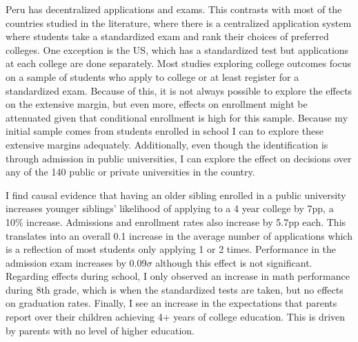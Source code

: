 Peru has decentralized applications and exams. This contrasts with most of the countries studied in the literature, where there is a centralized application system where students take a standardized exam and rank their choices of preferred colleges. One exception is the US, which has a standardized test but applications at each college are done separately.  Most studies exploring college outcomes focus on a sample of students who apply to college or at least register for a standardized exam. Because of this, it is not always possible to explore the effects on the extensive margin, but even more, effects on enrollment might be attenuated given that conditional enrollment is high for this sample. Because my initial sample comes from students enrolled in school I can to explore these extensive margins adequately. Additionally, even though the identification is through admission in public universities, I can explore the effect on decisions over any of the 140 public or private universities in the country.







I find causal evidence that having an older sibling enrolled in a public university increases younger siblings' likelihood of applying to a 4 year college by 7pp, a 10\% increase. Admissions and enrollment rates also increase by 5.7pp each. This translates into an overall 0.1 increase in the average number of applications which is a reflection of most students only applying 1 or 2 times. Performance in the admission exam increases by 0.09$\sigma$ although this effect is not significant. Regarding effects during school, I only observed an increase in math performance during 8th grade, which is when the standardized tests are taken, but no effects on graduation rates. Finally, I see an increase in the expectations that parents report over their children achieving 4+ years of college education. This is driven by parents with no level of higher education. 

